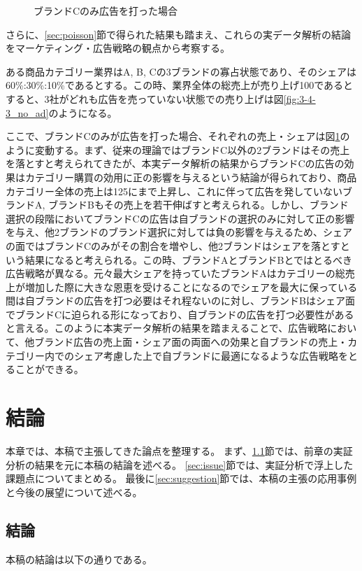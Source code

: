 \documentclass[11pt]{jsarticle}
\begin{document}
\begin{figure}[htbp]
\begin{minipage}{0.5\columnwidth}
  \caption{ブランドCのみ広告を打った場合}
  \label{fig:3-4-3_c_ad}
 \end{minipage}
\end{figure}

さらに、\ref{sec:poisson}節で得られた結果も踏まえ、これらの実データ解析の結論をマーケティング・広告戦略の観点から考察する。

ある商品カテゴリー業界はA, B, Cの3ブランドの寡占状態であり、そのシェアは60\%:30\%:10\%であるとする。この時、業界全体の総売上が売り上げ100であるとすると、3社がどれも広告を売っていない状態での売り上げは図\ref{fig:3-4-3_no_ad}のようになる。

ここで、ブランドCのみが広告を打った場合、それぞれの売上・シェアは図\ref{fig:3-4-3_c_ad}のように変動する。まず、従来の理論ではブランドC以外の2ブランドはその売上を落とすと考えられてきたが、本実データ解析の結果からブランドCの広告の効果はカテゴリー購買の効用に正の影響を与えるという結論が得られており、商品カテゴリー全体の売上は125にまで上昇し、これに伴って広告を発していないブランドA, ブランドBもその売上を若干伸ばすと考えられる。しかし、ブランド選択の段階においてブランドCの広告は自ブランドの選択のみに対して正の影響を与え、他2ブランドのブランド選択に対しては負の影響を与えるため、シェアの面ではブランドCのみがその割合を増やし、他2ブランドはシェアを落とすという結果になると考えられる。この時、ブランドAとブランドBとではとるべき広告戦略が異なる。元々最大シェアを持っていたブランドAはカテゴリーの総売上が増加した際に大きな恩恵を受けることになるのでシェアを最大に保っている間は自ブランドの広告を打つ必要はそれ程ないのに対し、ブランドBはシェア面でブランドCに迫られる形になっており、自ブランドの広告を打つ必要性があると言える。このように本実データ解析の結果を踏まえることで、広告戦略において、他ブランド広告の売上面・シェア面の両面への効果と自ブランドの売上・カテゴリー内でのシェア考慮した上で自ブランドに最適になるような広告戦略をとることができる。


\section{結論}
\label{ch:conclusion}
本章では、本稿で主張してきた論点を整理する。
まず、\ref{sec:conclusion}節では、前章の実証分析の結果を元に本稿の結論を述べる。
\ref{sec:issue}節では、実証分析で浮上した課題点についてまとめる。
最後に\ref{sec:suggestion}節では、本稿の主張の応用事例と今後の展望について述べる。

\subsection{結論}
\label{sec:conclusion}
本稿の結論は以下の通りである。
\end{document}
